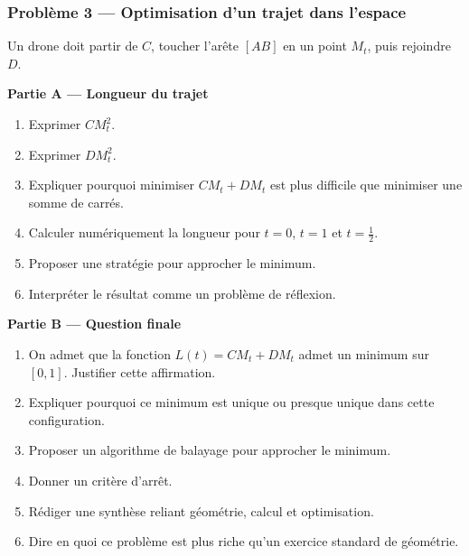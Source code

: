 \documentclass[11pt,a4paper]{article}
\begin{document}
\begin{difficile}
\subsubsection*{Problème 3 — Optimisation d'un trajet dans l'espace}

Un drone doit partir de $C$, toucher l'arête $[AB]$ en un point $M_t$, puis rejoindre $D$.

\textbf{Partie A — Longueur du trajet}
\begin{enumerate}
  \item Exprimer $CM_t^2$.
  \item Exprimer $DM_t^2$.
  \item Expliquer pourquoi minimiser $CM_t+DM_t$ est plus difficile que minimiser une somme de carrés.
  \item Calculer numériquement la longueur pour $t=0$, $t=1$ et $t=\frac12$.
  \item Proposer une stratégie pour approcher le minimum.
  \item Interpréter le résultat comme un problème de réflexion.
\end{enumerate}

\textbf{Partie B — Question finale}
\begin{enumerate}
  \item On admet que la fonction $L(t)=CM_t+DM_t$ admet un minimum sur $[0,1]$. Justifier cette affirmation.
  \item Expliquer pourquoi ce minimum est unique ou presque unique dans cette configuration.
  \item Proposer un algorithme de balayage pour approcher le minimum.
  \item Donner un critère d'arrêt.
  \item Rédiger une synthèse reliant géométrie, calcul et optimisation.
  \item Dire en quoi ce problème est plus riche qu'un exercice standard de géométrie.
\end{enumerate}
\end{difficile}
\end{document}
